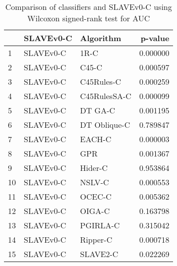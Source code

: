 \begin{table}
\footnotesize
\caption{Comparison of classifiers and SLAVEv0-C using Wilcoxon signed-rank test for AUC}
\label{tab:SLAVEv0-C wilcoxon AUC comparison}
\begin{tabular}{lllr}
\hline
 & SLAVEv0-C & Algorithm & p-value \\
\hline
1 & SLAVEv0-C & 1R-C & 0.000000 \\
2 & SLAVEv0-C & C45-C & 0.000597 \\
3 & SLAVEv0-C & C45Rules-C & 0.000259 \\
4 & SLAVEv0-C & C45RulesSA-C & 0.000099 \\
5 & SLAVEv0-C & DT GA-C & 0.001195 \\
6 & SLAVEv0-C & DT Oblique-C & 0.789847 \\
7 & SLAVEv0-C & EACH-C & 0.000003 \\
8 & SLAVEv0-C & GPR & 0.001367 \\
9 & SLAVEv0-C & Hider-C & 0.953864 \\
10 & SLAVEv0-C & NSLV-C & 0.000553 \\
11 & SLAVEv0-C & OCEC-C & 0.005362 \\
12 & SLAVEv0-C & OIGA-C & 0.163798 \\
13 & SLAVEv0-C & PGIRLA-C & 0.315042 \\
14 & SLAVEv0-C & Ripper-C & 0.000718 \\
15 & SLAVEv0-C & SLAVE2-C & 0.022269 \\
\hline
\end{tabular}
\end{table}
